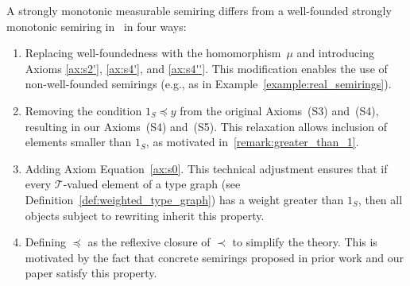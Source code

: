 \begin{remark}
    \label{remark:diff_measurable_semiring}
A strongly monotonic measurable semiring differs from a well-founded strongly monotonic semiring in~\cite{endrullis2024generalized} in four ways:
\begin{enumerate}[label=(\arabic*),noitemsep]
    \item Replacing well-foundedness with the homomorphism~$\mu$ and introducing Axioms \eqref{ax:s2'}, \eqref{ax:s4'}, and \eqref{ax:s4''}. This modification enables the use of non-well-founded semirings (e.g., as in Example~\ref{example:real_semirings}).
    \item Removing the condition $1_S \preceq y$ from the original Axioms~(S3) and~(S4), resulting in our Axioms~(S4) and~(S5). This relaxation allows inclusion of elements smaller than $1_S$, as motivated in~\autoref{remark:greater_than_1}.
    \item Adding Axiom Equation~\eqref{ax:s0}. This technical adjustment ensures that if every $\mathcal{T}$-valued element of a type graph (see Definition~\ref{def:weighted_type_graph}) has a weight greater than $1_S$, then all objects subject to rewriting inherit this property.
    \item Defining $\preceq$ as the reflexive closure of $\prec$ to simplify the theory. This is motivated by the fact that concrete semirings proposed in prior work and our paper satisfy this property.
\end{enumerate} 
\end{remark}